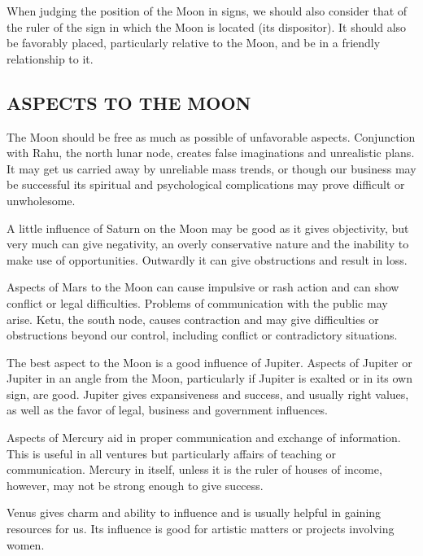  

When judging the position of the Moon in signs, we should also consider that of the ruler of the sign in which the Moon is located (its dispositor). It should also be favorably placed, particularly relative to the Moon, and be in a friendly relationship to it.

\subsection{ASPECTS TO THE MOON}
 

The Moon should be free as much as possible of unfavorable aspects. Conjunction with Rahu, the north lunar node, creates false imaginations and unrealistic plans. It may get us carried away by unreliable mass trends, or though our business may be successful its spiritual and psychological complications may prove difficult or unwholesome.

 

A little influence of Saturn on the Moon may be good as it gives objectivity, but very much can give negativity, an overly conservative nature and the inability to make use of opportunities. Outwardly it can give obstructions and result in loss.

 

Aspects of Mars to the Moon can cause impulsive or rash action and can show conflict or legal difficulties. Problems of communication with the public may arise. Ketu, the south node, causes contraction and may give difficulties or obstructions beyond our control, including conflict or contradictory situations.

 

The best aspect to the Moon is a good influence of Jupiter. Aspects of Jupiter or Jupiter in an angle from the Moon, particularly if Jupiter is exalted or in its own sign, are good. Jupiter gives expansiveness and success, and usually right values, as well as the favor of legal, business and government influences.

 

Aspects of Mercury aid in proper communication and exchange of information. This is useful in all ventures but particularly affairs of teaching or communication. Mercury in itself, unless it is the ruler of houses of income, however, may not be strong enough to give success.

 

Venus gives charm and ability to influence and is usually helpful in gaining resources for us. Its influence is good for artistic matters or projects involving women.

